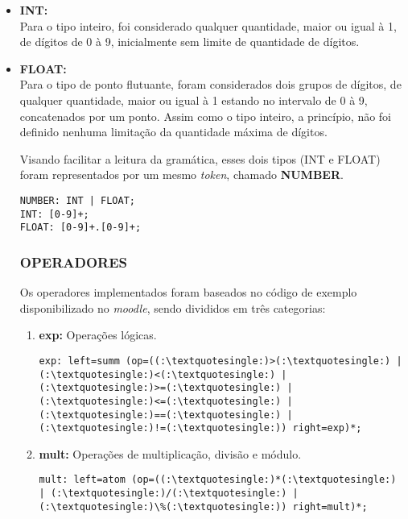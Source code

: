             \begin{itemize}
                \item \textbf{INT:}\\
                    Para o tipo inteiro, foi considerado qualquer quantidade, maior ou igual à 1, de dígitos de 0 à 9, inicialmente sem limite de quantidade de dígitos.

                \item \textbf{FLOAT:}\\
                    Para o tipo de ponto flutuante, foram considerados dois grupos de dígitos, de qualquer quantidade, maior ou igual à 1 estando no intervalo de 0 à 9, concatenados por um ponto. Assim como o tipo inteiro, a princípio, não foi definido nenhuma limitação da quantidade máxima de dígitos.

                    Visando facilitar a leitura da gramática, esses dois tipos (INT e FLOAT) foram representados por um mesmo \textit{token}, chamado \textbf{NUMBER}.

                    \begin{lstlisting}
NUMBER: INT | FLOAT;
INT: [0-9]+;
FLOAT: [0-9]+.[0-9]+;
                    \end{lstlisting}
                    
        \subsubsection{\normalsize OPERADORES}
            Os operadores implementados foram baseados no código de exemplo disponibilizado no \textit{moodle}, sendo divididos em três categorias:
            \begin{enumerate}
                \item \textbf{exp:} Operações lógicas.
                    \begin{lstlisting}
exp: left=summ (op=((:\textquotesingle:)>(:\textquotesingle:) | (:\textquotesingle:)<(:\textquotesingle:) | (:\textquotesingle:)>=(:\textquotesingle:) | (:\textquotesingle:)<=(:\textquotesingle:) | (:\textquotesingle:)==(:\textquotesingle:) | (:\textquotesingle:)!=(:\textquotesingle:)) right=exp)*;
                    \end{lstlisting}

                \item \textbf{mult:} Operações de multiplicação, divisão e módulo.
                    \begin{lstlisting}
mult: left=atom (op=((:\textquotesingle:)*(:\textquotesingle:) | (:\textquotesingle:)/(:\textquotesingle:) | (:\textquotesingle:)\%(:\textquotesingle:)) right=mult)*;
                    \end{lstlisting}


\end{enumerate}
\end{itemize}
